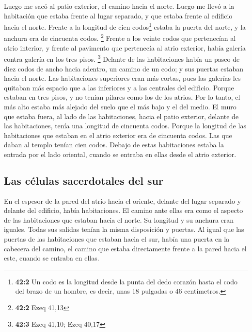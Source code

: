 \begin{paracol}{2}
 Luego me sacó al patio exterior, el camino hacia el
norte. Luego me llevó a la habitación que estaba frente al lugar
separado, y que estaba frente al edificio hacia el norte. 
Frente a la longitud de cien codos\footnote{\textbf{42:2} Un codo es la
  longitud desde la punta del dedo corazón hasta el codo del brazo de un
  hombre, es decir, unas 18 pulgadas o 46 centímetros.} estaba la puerta
del norte, y la anchura era de cincuenta codos. \footnote{\textbf{42:2}
  Ezeq 41,13}  Frente a los veinte codos que pertenecían
al atrio interior, y frente al pavimento que pertenecía al atrio
exterior, había galería contra galería en los tres pisos. \footnote{\textbf{42:3}
  Ezeq 41,10; Ezeq 40,17}  Delante de las habitaciones
había un paseo de diez codos de ancho hacia adentro, un camino de un
codo; y sus puertas estaban hacia el norte.  Las
habitaciones superiores eran más cortas, pues las galerías les quitaban
más espacio que a las inferiores y a las centrales del edificio.
 Porque estaban en tres pisos, y no tenían pilares como
los de los atrios. Por lo tanto, el más alto estaba más alejado del
suelo que el más bajo y el del medio.  El muro que estaba
fuera, al lado de las habitaciones, hacia el patio exterior, delante de
las habitaciones, tenía una longitud de cincuenta codos. 
Porque la longitud de las habitaciones que estaban en el atrio exterior
era de cincuenta codos. Las que daban al templo tenían cien codos.
 Debajo de estas habitaciones estaba la entrada por el
lado oriental, cuando se entraba en ellas desde el atrio exterior.

\hypertarget{las-cuxe9lulas-sacerdotales-del-sur}{%
\subsection{Las células sacerdotales del
sur}\label{las-cuxe9lulas-sacerdotales-del-sur}}

 En el espesor de la pared del atrio hacia el oriente,
delante del lugar separado y delante del edificio, había habitaciones.
 El camino ante ellas era como el aspecto de las
habitaciones que estaban hacia el norte. Su longitud y su anchura eran
iguales. Todas sus salidas tenían la misma disposición y puertas.
 Al igual que las puertas de las habitaciones que estaban
hacia el sur, había una puerta en la cabecera del camino, el camino que
estaba directamente frente a la pared hacia el este, cuando se entraba
en ellas.


\end{paracol}
